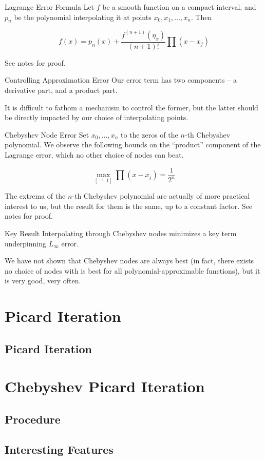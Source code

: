 \documentclass[pdf]{beamer}
\begin{document}
\begin{frame}{Lagrange Error Formula}
  Let $f$ be a smooth function on a compact interval, and $p_n$ be the
  polynomial interpolating it at points $x_0, x_1, \ldots, x_n$. Then

  \[ f(x) = p_n(x) + \frac{f^{(n+1)}(\eta_x)}{(n+1)!} \prod (x-x_j) \]

  See notes for proof.
\end{frame}

\begin{frame}{Controlling Approximation Error}
  Our error term has two components -- a derivative part, and a product
  part.\newline

  It is difficult to fathom a mechanism to control the former, but
  the latter should be directly impacted by our choice of interpolating points.
\end{frame}


\begin{frame}{Chebyshev Node Error}
  Set $x_0,\ldots,x_n$ to the zeros of the $n$-th Chebyshev polynomial.
  We observe the following bounds on the ``product'' component of the
  Lagrange error, which no other choice of nodes can beat.

  \[ \max_{[-1,1]} \prod(x-x_j) = \frac{1}{2^n}\]

  The extrema of the $n$-th Chebyshev polynomial are actually of more practical
  interest to us, but the result for them is the same, up to a constant
  factor. See notes for proof.\end{frame}

\begin{frame}{Key Result}
  Interpolating through Chebyshev nodes minimizes a key term underpinning
  $L_\infty$ error.\newline

  We have not shown that Chebyshev nodes are always best (in fact, there exists no
  choice of nodes with is best for all polynomial-approximable functions), but
  it is very good, very often.
\end{frame}

\section{Picard Iteration}
\subsection{Picard Iteration}

\section{Chebyshev Picard Iteration}
\subsection{Procedure}

\subsection{Interesting Features}
\end{document}
